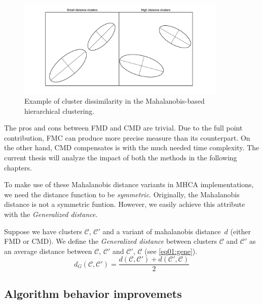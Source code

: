 \begin{figure}\centering
	\includegraphics[width=10cm]{img/ellipses}
	\caption{Example of cluster dissimilarity in the Mahalanobis-based hierarchical clustering.}
	\label{fig01:ellipses}
\end{figure}



The pros and cons between FMD and CMD are trivial. Due to the full point contribution, FMC can produce more precise measure than its counterpart. On the other hand, CMD compensates is with the much needed time complexity. The current thesis will analyze the impact of both the methods in the following chapters.

\vspace{0.5cm}

To make use of these Mahalanobis distance variants in MHCA implementations, we need the distance function to be \emph{symmetric}. Originally, the Mahalanobis distance is not a symmetric funtion. However, we easily achieve this attribute with the \emph{Generalized distance}.

\begin{defn}
	Suppose we have clusters $\mathcal{C}$, $\mathcal{C}'$ and a variant of mahalanobis distance~$d$ (either FMD or CMD). We define the \emph{Generalized distance} between clusters $\mathcal{C}$ and $\mathcal{C}'$ as an average distance between $\mathcal{C}$, $\mathcal{C}'$ and $\mathcal{C}'$, $\mathcal{C}$ (see \ref{eq01:gene}).
	\begin{equation}\label{eq01:gene}
	d_G(\mathcal{C},\mathcal{C}') = \frac{d(\mathcal{C},\mathcal{C}')+d(\mathcal{C}',\mathcal{C})}{2}
	\end{equation}
	\label{def01:gene}
\end{defn}  


\subsection{Algorithm behavior improvemets}

